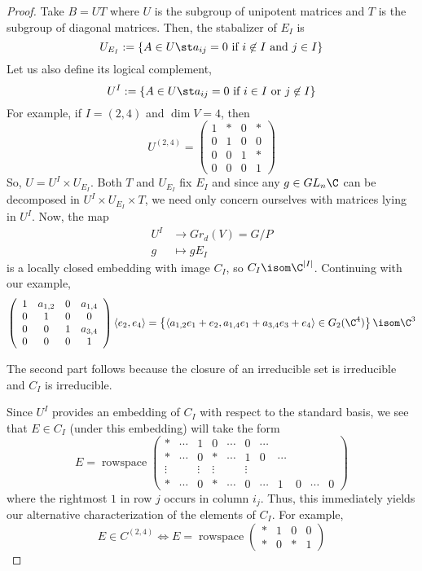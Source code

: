 \documentclass[11pt,leqno,oneside]{amsbook}
\numberwithin{thm}{section}
\newcommand{\Gr}{Gr}
\begin{document}
\begin{proof}
  Take \(B = UT\) where \(U\) is the subgroup of unipotent matrices
  and \(T\) is the subgroup of diagonal matrices. Then, the stabalizer
  of \(E_I\) is \[
    U_{E_I} := \{A \in U \st a_{ij} = 0 \text{ if }i \not \in I \text{
    and }j \in I\}
\]
Let us also define its logical complement, \[
  U^I := \{A \in U \st a_{ij} = 0 \text{ if }i \in I \text{ or }j \not
  \in I\}
\]
For example, if \(I=(2,4)\) and \(\dim V = 4\), then \[
  U^{(2,4)} = \left(
    \begin{array}{cccc}
      1&*&0&*\\
      0&1&0&0\\
      0&0&1&*\\
      0&0&0&1
    \end{array}
\right)
\]
So, \(U = U^I \times U_{E_I}\). Both
\(T\) and \(U_{E_I}\) fix 
\(E_I\) and since any \(g \in GL_n \C\) can be decomposed in \(U^I
\times U_{E_I} \times T\), we need only concern ourselves with
matrices lying in \(U^I\). Now, the map
\begin{align*}
  U^I & \to \Gr_d(V) = G/P\\
  g & \mapsto gE_I
\end{align*}
is a locally closed embedding with image \(C_I\), so \(C_I \isom
\C^{|I|}\). Continuing with our example, \[
 \left(
    \begin{array}{cccc}
      1&a_{1,2}&0&a_{1,4}\\
      0&1&0&0\\
      0&0&1&a_{3,4}\\
      0&0&0&1
    \end{array}
  \right)\langle e_2, e_4 \rangle  = \left\{ \langle
    a_{1,2}e_1+e_2,a_{1,4}e_1+a_{3,4}e_3+e_4 \rangle \in G_2(\C^4)
  \right\} \isom \C^3
\]

The second part follows because the closure of an irreducible set is
irreducible and \(C_I\) is irreducible.

Since \(U^I\) provides an embedding of \(C_I\) with respect to the
standard basis, we see that \(E \in C_I\) (under this embedding) will
take the form \[ 
  E = \operatorname{rowspace} \left(
    \begin{array}{ccccccccccc}
      *&\cdots&1&0&\cdots&0&\cdots&&&&\\
      *&\cdots&0&*&\cdots&1&0&\cdots&&&\\
      \vdots&&\vdots&\vdots&&\vdots&&&&&\\
      *&\cdots&0&*&\cdots&0&\cdots&1&0&\cdots&0
    \end{array}
\right)
\]
where the rightmost \(1\) in row \(j\) occurs in column \(i_j\). Thus,
this immediately yields our alternative characterization of the
elements of \(C_I\). For example, \[
  E \in C^{(2,4)} \iff E = \operatorname{rowspace} \left(
    \begin{array}{cccc}
      *&1&0&0\\
      *&0&*&1
    \end{array}
\right)
\]


\end{proof}
\end{document}
